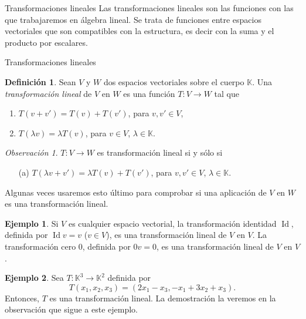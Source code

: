 \documentclass[a4paper,12pt,twoside,spanish,reqno]{amsbook}
\theoremstyle{definition}
\newtheorem{definicion}{Definici\'on}[section]
\newtheorem{ejemplo}{Ejemplo}[section]
\theoremstyle{remark}
\newtheorem{obs}{Observaci\'on}[section]
\newcommand{\Id}{\operatorname{Id}}
\newcommand{\K}{\mathbb K}
\begin{document}
        
    \begin{chapter}{Transformaciones lineales}\label{chap-trans-lin}
        Las transformaciones lineales son las funciones con las que trabajaremos en álgebra lineal. Se trata de funciones entre espacios vectoriales que son compatibles con la estructura,  es decir con la suma y el producto por escalares.
        
        
        \begin{section}{Transformaciones lineales}
            \begin{definicion}
                Sean $V$ y $W$ dos espacios vectoriales sobre el cuerpo $\K$. Una 				\textit{transformación lineal} de $V$ en $W$ es una función $T:V \to W$  tal que
                \begin{enumerate}
                    \item $T(v+v') = T(v)+ T(v')$, para $v,v' \in V$,
                    \item $T(\lambda v) = \lambda T(v)$, para $v \in V$, $\lambda \in \K$.
                \end{enumerate}
            \end{definicion}
        
            \begin{obs}
                $T:V \to W$ es transformación lineal si y sólo si
                \begin{enumerate}
                    \item[({a})]  $T(\lambda v+v') = \lambda T(v)+ T(v')$, para $v,v' \in V$, $\lambda \in \K$.
                \end{enumerate}
            Algunas veces usaremos esto último para comprobar si una aplicación de $V$ en $W$ es una transformación lineal. 
            \end{obs}
            
            \begin{ejemplo}
                Si $V$ es cualquier espacio vectorial, la transformación identidad $\Id$, definida por $\Id v = v$ ($v \in V$), es una transformación lineal de $V$ en $V$. La transformación cero $0$, definida por $0v = 0$, es una transformación lineal de $V$ en $V$.
            \end{ejemplo}
        
            \begin{ejemplo}\label{ejemplo-lineal-3}
                Sea $T : \K^3 \to \K^2$ definida por
                $$
                T(x_1,x_2,x_3) = (2x_1 - x_3, -x_1+3x_2+x_3).
                $$
                Entonces, $T$  es una transformación lineal. La demostración la veremos en la observación que sigue a este ejemplo. 
                

\end{ejemplo}
\end{section}
\end{chapter}
\end{document}
